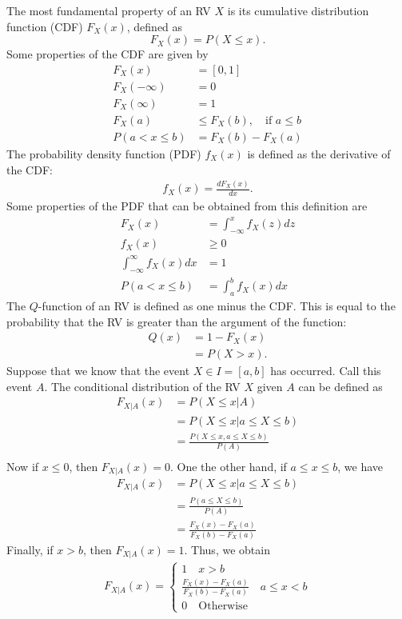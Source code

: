 The most fundamental property of an RV $X$ is its cumulative distribution function (CDF) $F_X(x)$, defined as 
$$F_{X}(x) = P(X\leq x).$$
Some properties of the CDF are given by
\begin{align*}
	F_X(x)&= [0,1]\\
	F_X(-\infty)&= 0\\
	F_X(\infty)&= 1\\
	F_X(a)&\leq F_X(b), \quad \text{if }a\leq b \\
	P(a<x\leq b)&=F_X(b)-F_X(a)
\end{align*}
The probability density function (PDF) $f_X(x)$ is defined as the derivative of the CDF:
\begin{align*}
	f_X(x) = \frac{dF_X(x)}{dx}.
\end{align*}
Some properties of the PDF that can be obtained from this definition are
\begin{align*}
	F_X(x) &= \int_{-\infty}^xf_X(z)dz\\
	f_X(x)&\geq 0\\
	\int_{-\infty}^{\infty}f_X(x)dx&= 1\\
	P(a<x\leq b)&=\int_{a}^bf_X(x)dx
\end{align*}
The $Q$-function of an RV is defined as one minus the CDF. This is equal to the probability that the RV is greater than the argument of the function: 
\begin{align*}
	Q(x)&= 1-F_X(x)\\
		&= P(X>x).
\end{align*}
Suppose that we know that the event $X\in I=[a,b]$ has occurred. Call this event $A$. The conditional distribution of the RV $X$ given $A$ can be defined as
\begin{align*}
	F_{X|A}(x)&= P(X\leq x|A)\\
			&= P(X\leq x|a\leq X \leq b)\\
			&= \frac{P(X\leq x,a\leq X \leq b)}{P(A)}\\
\end{align*}
Now if $x\leq 0$, then $F_{X|A}(x)=0$. One the other hand, if $a\leq x \leq b$, we have
\begin{align*}
	F_{X|A}(x)&= P(X\leq x|a\leq X \leq b)\\
			&= \frac{P(a\leq X \leq b)}{P(A)}\\
			&= \frac{F_X(x)-F_X(a)}{F_X(b)-F_X(a)}
\end{align*}
Finally, if $x>b$, then $F_{X|A}(x)=1$. Thus, we obtain
\begin{align*}
F_{X|A}(x)=
	\begin{cases}
	1\quad x>b\\	
	\frac{F_X(x)-F_X(a)}{F_X(b)-F_X(a)}\quad a\leq x <b\\	
	0\quad \text{Otherwise}\
	\end{cases}
\end{align*}

